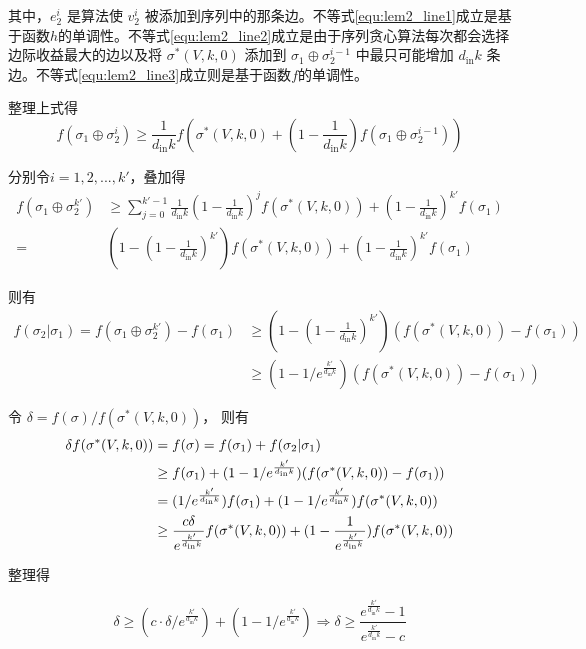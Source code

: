 其中，$e_2^i$ 是算法使 $v_2^i$ 被添加到序列中的那条边。不等式\ref{equ:lem2_line1}成立是基于函数$h$的单调性。不等式\ref{equ:lem2_line2}成立是由于序列贪心算法每次都会选择边际收益最大的边以及将 $\sigma^*(V,k,0)$ 添加到 $\sigma_1 \oplus \sigma_2^{i-1}$ 中最只可能增加 $d_{\text{in}}k$ 条边。不等式\ref{equ:lem2_line3}成立则是基于函数$f$的单调性。

整理上式得
\begin{equation}
    f(\sigma_1 \oplus \sigma_2^i) \ge \frac{1}{d_{\text{in}}k} f(\sigma^*(V,k,0) + (1-\frac{1}{d_{\text{in}}k}) f(\sigma_1 \oplus \sigma_2^{i-1}))
\end{equation}

分别令$i= 1,2,...,k'$，叠加得
\begin{align}
    f(\sigma_1 \oplus \sigma_2^{k'}) &\ge \sum_{j=0}^{k'-1}\frac{1}{d_{\text{in}}k}(1-\frac{1}{d_{\text{in}}k})^j f(\sigma^*(V,k,0)) + (1-\frac{1}{d_{\text{in}}k})^{k'} f(\sigma_1) \\
    =& (1-(1- \frac{1}{d_{\text{in}}k})^{k'})f(\sigma^*(V,k,0)) + (1-\frac{1}{d_{\text{in}}k})^{k'} f(\sigma_1)
\end{align}

则有
\begin{align}
    f(\sigma_2 | \sigma_1) = f(\sigma_1 \oplus \sigma_2^{k'}) - f(\sigma_1) & \ge (1-(1- \frac{1}{d_{\text{in}}k})^{k'})(f(\sigma^*(V,k,0)) - f(\sigma_1)) \\
    & \ge (1-1/e^{\frac{k'}{d_{\text{in}}k}})(f(\sigma^*(V,k,0)) - f(\sigma_1))
\end{align}

令 $\delta = f(\sigma) /f(\sigma^*(V,k,0))$， 则有
\begin{align}
\small
\delta f(\sigma^*(V,k,0)) &= f(\sigma) = f(\sigma_1)+f(\sigma_2|\sigma_1) \\ &\ge f(\sigma_1) + (1-1/e^{\frac{k'}{d_{\text{in}}k}})(f(\sigma^*(V,k,0)) - f(\sigma_1)) \\
& = (1/e^{\frac{k'}{d_{\text{in}}k}}) f(\sigma_1) + (1-1/e^{\frac{k'}{d_{\text{in}}k}})f(\sigma^*(V,k,0)) \\ &\ge \frac{c\delta}{e^{\frac{k'}{d_{\text{in}}k}}} f(\sigma^*(V,k,0)) + (1-\frac{1}{e^{\frac{k'}{d_{\text{in}}k}}})f(\sigma^*(V,k,0))
\end{align}

整理得

\begin{equation}
\delta \ge (c\cdot \delta/e^{\frac{k'}{d_{\text{in}}k}}) + (1-1/e^{\frac{k'}{d_{\text{in}}k}}) \Longrightarrow
\delta \ge \frac{e^{\frac{k'}{d_{\text{in}}k}}-1}{e^{\frac{k'}{d_{\text{in}}k}}-c}
\end{equation}

